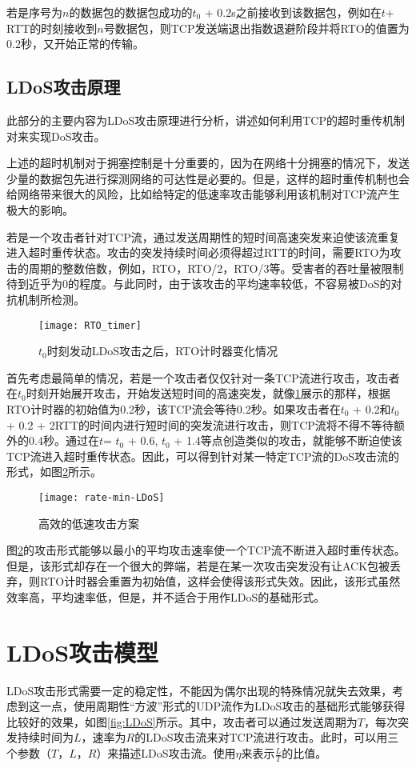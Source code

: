 若是序号为$n$的数据包的数据包成功的$t_0$ + 0.2s之前接收到该数据包，例如在$t$+ RTT的时刻接收到$n$号数据包，则TCP发送端退出指数退避阶段并将RTO的值置为0.2秒，又开始正常的传输。

\subsection{LDoS攻击原理}
此部分的主要内容为LDoS攻击原理进行分析，讲述如何利用TCP的超时重传机制对来实现DoS攻击。

上述的超时机制对于拥塞控制是十分重要的，因为在网络十分拥塞的情况下，发送少量的数据包先进行探测网络的可达性是必要的。但是，这样的超时重传机制也会给网络带来很大的风险，比如给特定的低速率攻击能够利用该机制对TCP流产生极大的影响。

若是一个攻击者针对TCP流，通过发送周期性的短时间高速突发来迫使该流重复进入超时重传状态。攻击的突发持续时间必须得超过RTT的时间，需要RTO为攻击的周期的整数倍数，例如，RTO，RTO/2，RTO/3等。受害者的吞吐量被限制待到近乎为0的程度。与此同时，由于该攻击的平均速率较低，不容易被DoS的对抗机制所检测。

\begin{figure}
    \centering
    \texttt{[image: RTO\_timer]}
    \caption{$t_0$时刻发动LDoS攻击之后，RTO计时器变化情况}
    \label{fig:rto-timer}
\end{figure}

首先考虑最简单的情况，若是一个攻击者仅仅针对一条TCP流进行攻击，攻击者在$t_0$时刻开始展开攻击，开始发送短时间的高速突发，就像\ref{fig:rto-timer}展示的那样，根据RTO计时器的初始值为0.2秒，该TCP流会等待0.2秒。如果攻击者在$t_0$ + 0.2和$t_0$ + 0.2 + 2RTT的时间内进行短时间的突发流进行攻击，则TCP流将不得不等待额外的0.4秒。通过在$t$= $t_0$ + 0.6, $t_0$ + 1.4等点创造类似的攻击，就能够不断迫使该TCP流进入超时重传状态。因此，可以得到针对某一特定TCP流的DoS攻击流的形式，如图\ref{fig:rate-min-LDoS}所示。

\begin{figure}
    \centering
    \texttt{[image: rate-min-LDoS]}
    \caption{高效的低速攻击方案}
    \label{fig:rate-min-LDoS}
\end{figure}

图\ref{fig:rate-min-LDoS}的攻击形式能够以最小的平均攻击速率使一个TCP流不断进入超时重传状态。但是，该形式却存在一个很大的弊端，若是在某一次攻击突发没有让ACK包被丢弃，则RTO计时器会重置为初始值，这样会使得该形式失效。因此，该形式虽然效率高，平均速率低，但是，并不适合于用作LDoS的基础形式。


\section{LDoS攻击模型}
\label{chap3:LDoS-model}
LDoS攻击形式需要一定的稳定性，不能因为偶尔出现的特殊情况就失去效果，考虑到这一点，使用周期性“方波”形式的UDP流作为LDoS攻击的基础形式能够获得比较好的效果，如图\ref{fig:LDoS}所示。其中，攻击者可以通过发送周期为$T$，每次突发持续时间为$L$，速率为$R$的LDoS攻击流来对TCP流进行攻击。此时，可以用三个参数（$T$，$L$，$R$）来描述LDoS攻击流。使用$\eta$来表示$\frac{L}{T}$的比值。

